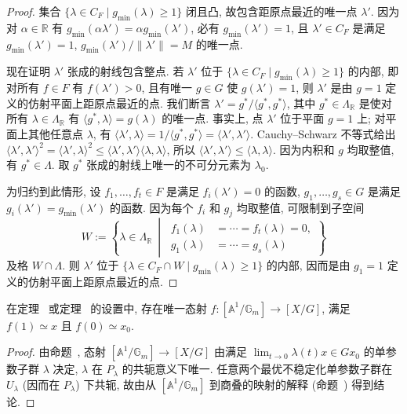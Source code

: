 \begin{proof}
集合 $\{\lambda\in C_F\mid g_{\min}(\lambda)\geq1\}$ 闭且凸, 故包含距原点最近的唯一点 $\lambda'$. 因为对 $\alpha\in\mathbb R$ 有 $g_{\min}(\alpha\lambda')=\alpha g_{\min}(\lambda')$, 必有 $g_{\min}(\lambda')=1$, 且 $\lambda'\in C_F$ 是满足 $g_{\min}(\lambda')=1$, $g_{\min}(\lambda')/\|\lambda'\|=M$ 的唯一点.

现在证明 $\lambda'$ 张成的射线包含整点. 若 $\lambda'$ 位于 $\{\lambda\in C_F\mid g_{\min}(\lambda)\geq1\}$ 的内部, 即对所有 $f\in F$ 有 $f(\lambda')>0$, 且有唯一 $g\in G$ 使 $g(\lambda')=1$, 则 $\lambda'$ 是由 $g=1$ 定义的仿射平面上距原点最近的点. 我们断言 $\lambda'=g^*/\langle g^*,g^*\rangle$, 其中 $g^*\in\Lambda_{\mathbb R}$ 是使对所有 $\lambda\in\Lambda_{\mathbb R}$ 有 $\langle g^*,\lambda\rangle=g(\lambda)$ 的唯一点. 事实上, 点 $\lambda'$ 位于平面 $g=1$ 上; 对平面上其他任意点 $\lambda$, 有 $\langle\lambda',\lambda\rangle=1/\langle g^*,g^*\rangle=\langle\lambda',\lambda'\rangle$. Cauchy--Schwarz 不等式给出 $\langle\lambda',\lambda'\rangle^2=\langle\lambda',\lambda\rangle^2\leq\langle\lambda',\lambda'\rangle\langle\lambda,\lambda\rangle$, 所以 $\langle\lambda',\lambda'\rangle\leq\langle\lambda,\lambda\rangle$. 因为内积和 $g$ 均取整值, 有 $g^*\in\Lambda$. 取 $g^*$ 张成的射线上唯一的不可分元素为 $\lambda_0$.

为归约到此情形, 设 $f_1,\ldots,f_t\in F$ 是满足 $f_i(\lambda')=0$ 的函数, $g_1,\ldots,g_s\in G$ 是满足 $g_i(\lambda')=g_{\min}(\lambda')$ 的函数. 因为每个 $f_i$ 和 $g_j$ 均取整值, 可限制到子空间
\[
W:=\left\{\lambda\in\Lambda_{\mathbb R}\ \middle|\ \begin{aligned}f_1(\lambda)&=\cdots=f_t(\lambda)=0,\\g_1(\lambda)&=\cdots=g_s(\lambda)\end{aligned}\right\}
\]
及格 $W\cap\Lambda$. 则 $\lambda'$ 位于 $\{\lambda\in C_F\cap W\mid g_{\min}(\lambda)\geq1\}$ 的内部, 因而是由 $g_1=1$ 定义的仿射平面上距原点最近的点.
\end{proof}
\begin{corollary}\label{src:8.6.10}
在定理~ 或定理~ 的设置中, 存在唯一态射 $f:[\mathbb A^1/\mathbb G_m]\to[X/G]$, 满足 $f(1)\simeq x$ 且 $f(0)\simeq x_0$.
\end{corollary}
\begin{proof}
由命题~, 态射 $[\mathbb A^1/\mathbb G_m]\to[X/G]$ 由满足 $\lim_{t\to0}\lambda(t)x\in Gx_0$ 的单参数子群 $\lambda$ 决定, $\lambda$ 在 $P_\lambda$ 的共轭意义下唯一. 任意两个最优不稳定化单参数子群在 $U_\lambda$ (因而在 $P_\lambda$) 下共轭, 故由从 $[\mathbb A^1/\mathbb G_m]$ 到商叠的映射的解释 (命题~) 得到结论.
\end{proof}

